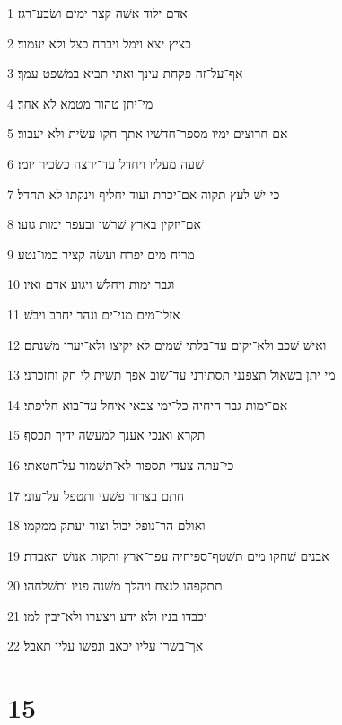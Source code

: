 \par 1 אדם ילוד אשׁה קצר ימים ושׂבע־רגז׃
\par 2 כציץ יצא וימל ויברח כצל ולא יעמוד׃
\par 3 אף־על־זה פקחת עינך ואתי תביא במשׁפט עמך׃
\par 4 מי־יתן טהור מטמא לא אחד׃
\par 5 אם חרוצים ימיו מספר־חדשׁיו אתך חקו עשׂית ולא יעבור׃
\par 6 שׁעה מעליו ויחדל עד־ירצה כשׂכיר יומו׃
\par 7 כי ישׁ לעץ תקוה אם־יכרת ועוד יחליף וינקתו לא תחדל׃
\par 8 אם־יזקין בארץ שׁרשׁו ובעפר ימות גזעו׃
\par 9 מריח מים יפרח ועשׂה קציר כמו־נטע׃
\par 10 וגבר ימות ויחלשׁ ויגוע אדם ואיו׃
\par 11 אזלו־מים מני־ים ונהר יחרב ויבשׁ׃
\par 12 ואישׁ שׁכב ולא־יקום עד־בלתי שׁמים לא יקיצו ולא־יערו משׁנתם׃
\par 13 מי יתן בשׁאול תצפנני תסתירני עד־שׁוב אפך תשׁית לי חק ותזכרני׃
\par 14 אם־ימות גבר היחיה כל־ימי צבאי איחל עד־בוא חליפתי׃
\par 15 תקרא ואנכי אענך למעשׂה ידיך תכסף׃
\par 16 כי־עתה צעדי תספור לא־תשׁמור על־חטאתי׃
\par 17 חתם בצרור פשׁעי ותטפל על־עוני׃
\par 18 ואולם הר־נופל יבול וצור יעתק ממקמו׃
\par 19 אבנים שׁחקו מים תשׁטף־ספיחיה עפר־ארץ ותקות אנושׁ האבדת׃
\par 20 תתקפהו לנצח ויהלך משׁנה פניו ותשׁלחהו׃
\par 21 יכבדו בניו ולא ידע ויצערו ולא־יבין למו׃
\par 22 אך־בשׂרו עליו יכאב ונפשׁו עליו תאבל׃

\chapter{15}


